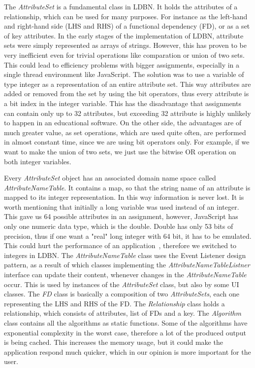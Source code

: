 The \textit{AttributeSet} is a fundamental class in LDBN. 
It holds the attributes of a relationship, which can be used
for many purposes. For instance as the left-hand and right-hand side (LHS and RHS) 
of a functional dependency (FD), or as a set of key attributes. 
In the early stages of the implementation of LDBN, attribute sets
were simply represented as arrays of strings. However, this has proven to be very
inefficient even for trivial operations like comparation or union of two sets. This could 
lead to efficiency problems with
bigger assignments, especially in a single thread environment like JavaScript. 
The solution was to use a variable of type integer as a representation of an entire
attribute set. 
This way attributes are added or removed from the set by using the bit operators, 
thus every attribute is 
a bit index in the integer variable. This has the disadvantage that
assignments can contain only up to 32 attributes, but exceeding 32 attribute 
is highly unlikely to happen in an educational software. On the other side, the 
advantages are of much greater value, as set operations, which are used quite 
often, are performed in almost constant time, since we are using bit operators only.
For example, if we want to make the union of two sets, we just use the 
bitwise OR operation on both integer variables.
 
Every \textit{AttributeSet} object has an associated domain name space called 
\textit{AttributeNameTable}. 
It contains a map, so that the string name of an attribute is mapped to its 
integer representation. In this way information is never lost. It is worth mentioning 
that initially a long variable was used
instead of an integer. This gave us 64 possible attributes in an assignment, 
however, JavaScript has only one numeric data type, which is the double. 
Double has only 53 bits of precision, thus if one want a "real" long integer with 64 bit, 
it has to be emulated. This could hurt the performance of an application~\cite{wgio1}, 
therefore we switched to integers in LDBN. The \textit{AttributeNameTable}
class uses the Event Listener design pattern, as a result of which classes implementing 
the \textit{AttributeNameTableListner} interface can update their content,
whenever changes in the \textit{AttributeNameTable} occur. This is used by instances of the 
\textit{AttributeSet} class, but also by some UI classes. The \textit{FD} class is basically a composition of two \textit{AttributeSets}, 
each one representing the LHS and RHS of the FD. The \textit{Relationship} class holds a relationship, which consists of attributes, 
list of FDs and a key. The \textit{Algorithm} class contains all the algorithms as
static functions. Some of the algorithms have exponential complexity in the worst
case, therefore a lot of the produced output is being cached. This increases the
memory usage, but it could make the application respond much quicker, which
in our opinion is more important for the user.    


